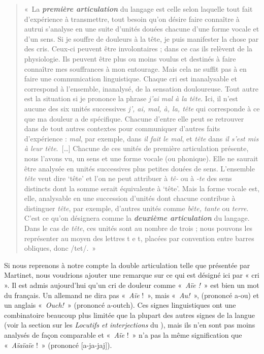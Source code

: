{    \begin{quote}
    «~La \textbf{\textit{première articulation}} du langage est celle selon laquelle tout fait d’expérience à transmettre, tout besoin qu’on désire faire connaître à autrui s’analyse en une suite d’unités douées chacune d’une forme vocale et d’un sens. Si je souffre de douleurs à la tête, je puis manifester la chose par des cris. Ceux-ci peuvent être involontaires ; dans ce cas ils relèvent de la physiologie. Ils peuvent être plus ou moins voulus et destinés à faire connaître mes souffrances à mon entourage. Mais cela ne suffit pas à en faire une communication linguistique. Chaque cri est inanalysable et correspond à l’ensemble, inanalysé, de la sensation douloureuse. Tout autre est la situation si je prononce la phrase \textit{j’ai mal à la tête}. Ici, il n’est aucune des six unités successives \textit{j’, ai, mal, à, la, tête} qui corresponde à ce que ma douleur a de spécifique. Chacune d’entre elle peut se retrouver dans de tout autres contextes pour communiquer d’autres faits d’expérience : \textit{mal}, par exemple, dans \textit{il fait le mal}, et \textit{tête} dans \textit{il s’est mis à leur tête}.~[…] Chacune de ces unités de première articulation présente, nous l’avons vu, un sens et une forme vocale (ou phonique). Elle ne saurait être analysée en unités successives plus petites douées de sens. L’ensemble \textit{tête} veut dire ‘tête’ et l’on ne peut attribuer à \textit{tê-} ou à \textit{{}-te} des sens distincts dont la somme serait équivalente à ‘tête’. Mais la forme vocale est, elle, analysable en une succession d’unités dont chacune contribue à distinguer \textit{tête}, par exemple, d’autres unités comme \textit{bête, tante} ou \textit{terre}. C’est ce qu’on désignera comme la \textbf{\textit{deuxième articulation}} du langage. Dans le cas de \textit{tête}, ces unités sont au nombre de trois ; nous pouvons les représenter au moyen des lettres t e t, placées par convention entre barres obliques, donc /tet/.~»
    \end{quote}

    Si nous reprenons à notre compte la double articulation telle que présentée par Martinet, nous voudrions ajouter une remarque sur ce qui est désigné ici par « cri ». Il est admis aujourd’hui qu’un cri de douleur comme «~\textit{Aïe !}~» est bien un mot du français. Un allemand ne dira pas «~\textit{Aïe} !~», mais «~\textit{Au!}~», (prononcé a-ou) et un anglais «~\textit{Ouch!~}» (prononcé a-outch). Ces signes linguistiques ont une combinatoire beaucoup plus limitée que la plupart des autres signes de la langue (voir la section sur les \textit{Locutifs et interjections} du ), mais ils n’en sont pas moins analysés de façon comparable et «~\textit{Aïe} !~» n’a pas la même signification que «~\textit{Aïaïaïe} !~» (prononcé [a-ja-jaj]).
}
